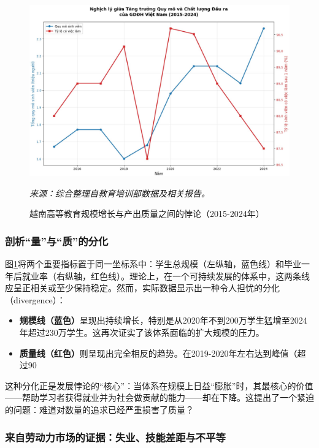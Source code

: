 \begin{figure}[h!]
    \centering
    \includegraphics[width=\textwidth]{image/nghich_ly_tang_truong_quy_mo_chat_luong.jpg}
    \caption{越南高等教育规模增长与产出质量之间的悖论（2015-2024年）}
    \label{fig:nghich_ly_quy_mo_chat_luong}
    \vspace{0.2cm}
    \footnotesize{\textit{来源：综合整理自教育培训部数据及相关报告。}}
\end{figure}

\subsubsection{剖析“量”与“质”的分化}

图\ref{fig:nghich_ly_quy_mo_chat_luong}将两个重要指标置于同一坐标系中：学生总规模（左纵轴，蓝色线）和毕业一年后就业率（右纵轴，红色线）。理论上，在一个可持续发展的体系中，这两条线应呈正相关或至少保持稳定。然而，实际数据显示出一种令人担忧的分化（divergence）：
\begin{itemize}
    \item \textbf{规模线（蓝色）}呈现出持续增长，特别是从2020年不到200万学生猛增至2024年超过230万学生。这再次证实了该体系面临的扩大规模的压力。
    \item \textbf{质量线（红色）}则呈现出完全相反的趋势。在2019-2020年左右达到峰值（超过90%
\end{itemize}
这种分化正是发展悖论的“核心”：当体系在规模上日益“膨胀”时，其最核心的价值——帮助学习者获得就业并为社会做贡献的能力——却在下降。这提出了一个紧迫的问题：难道对数量的追求已经严重损害了质量？

\subsubsection{来自劳动力市场的证据：失业、技能差距与不平等}


